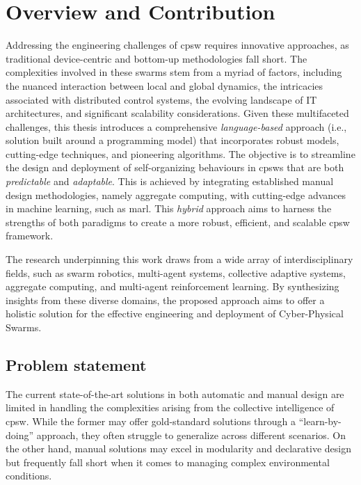 \section{Overview and Contribution}
Addressing the engineering challenges of \ac{cpsw} requires innovative approaches, 
 as traditional device-centric and bottom-up methodologies fall short. 
The complexities involved in these swarms stem from a myriad of factors, 
 including the nuanced interaction between local and global dynamics, 
 the intricacies associated with distributed control systems, 
 the evolving landscape of IT architectures, and significant scalability considerations.
%
Given these multifaceted challenges, 
 this thesis introduces a comprehensive \emph{language-based} approach (i.e., solution built around a programming model) that incorporates robust models, 
 cutting-edge techniques, and pioneering algorithms. 
 The objective is to streamline the design and deployment of self-organizing behaviours in \acp{cpsw} that are both \emph{predictable} and \emph{adaptable}. 
This is achieved by integrating established manual design methodologies, namely aggregate computing, 
 with cutting-edge advances in machine learning, such as \ac{marl}. 
%
This \emph{hybrid} approach aims to harness the strengths of both paradigms to create a more robust, efficient, and scalable \ac{cpsw} framework.

The research underpinning this work draws from a wide array of interdisciplinary fields, 
 such as swarm robotics, multi-agent systems, collective adaptive systems, aggregate computing, and multi-agent reinforcement learning. 
By synthesizing insights from these diverse domains, 
 the proposed approach aims to offer a holistic solution for the effective engineering and deployment of Cyber-Physical Swarms.
\subsection*{Problem statement}
The current state-of-the-art solutions in both automatic and manual design are limited in handling the complexities arising from the collective intelligence of \ac{cpsw}. 
 While the former may offer gold-standard solutions through a ``learn-by-doing'' approach, 
 they often struggle to generalize across different scenarios. 
 On the other hand, manual solutions may excel in modularity and declarative design but frequently fall short when it comes to managing complex environmental conditions.
